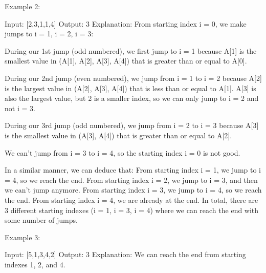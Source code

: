 Example 2:
\begin{Code}
Input: [2,3,1,1,4]
Output: 3
Explanation: 
From starting index i = 0, we make jumps to i = 1, i = 2, i = 3:

During our 1st jump (odd numbered), we first jump to i = 1 because A[1] is the smallest value in (A[1], A[2], A[3], A[4]) that is greater than or equal to A[0].

During our 2nd jump (even numbered), we jump from i = 1 to i = 2 because A[2] is the largest value in (A[2], A[3], A[4]) that is less than or equal to A[1].  A[3] is also the largest value, but 2 is a smaller index, so we can only jump to i = 2 and not i = 3.

During our 3rd jump (odd numbered), we jump from i = 2 to i = 3 because A[3] is the smallest value in (A[3], A[4]) that is greater than or equal to A[2].

We can't jump from i = 3 to i = 4, so the starting index i = 0 is not good.

In a similar manner, we can deduce that:
From starting index i = 1, we jump to i = 4, so we reach the end.
From starting index i = 2, we jump to i = 3, and then we can't jump anymore.
From starting index i = 3, we jump to i = 4, so we reach the end.
From starting index i = 4, we are already at the end.
In total, there are 3 different starting indexes (i = 1, i = 3, i = 4) where we can reach the end with some number of jumps.
\end{Code}

Example 3:
\begin{Code}
Input: [5,1,3,4,2]
Output: 3
Explanation: 
We can reach the end from starting indexes 1, 2, and 4.
\end{Code}


